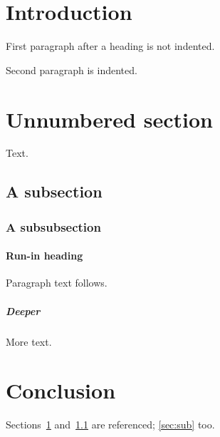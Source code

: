 \documentclass{article}
\begin{document}
\tableofcontents
\section{Introduction}\label{sec:intro}
First paragraph after a heading is not indented.

Second paragraph is indented.
\section*{Unnumbered section}
Text.
\subsection{A subsection}\label{sec:sub}
\subsubsection{A subsubsection}
\paragraph{Run-in heading} Paragraph text follows.
\subparagraph{Deeper} More text.
\section{Conclusion}
Sections~\ref{sec:intro} and~\ref{sec:sub} are referenced; \autoref{sec:sub} too.
\end{document}
